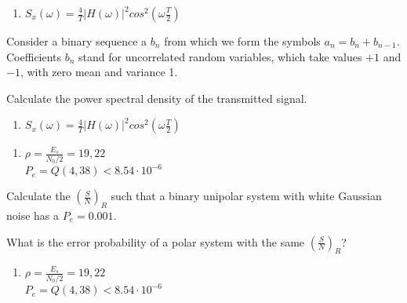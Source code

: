 \documentclass[en,boletin]{uah}
\begin{document}
{

\begin{enumerate}
	\item $S_x(\omega) = \frac{4}{T} |H(\omega)|^2 cos^2 \left ( \omega \frac{T}{2} \right ) $
\end{enumerate}
}
{

Consider a binary sequence a $b_n$ from which we form the symbols $a_n = b_n + b_{n-1}$. Coefficients $b_n$ stand for uncorrelated random variables, which take values $+1$ and $-1$, with zero mean and variance 1. 

Calculate the power spectral density of the transmitted signal.

}
{

\begin{enumerate}
	\item $S_x(\omega) = \frac{4}{T} |H(\omega)|^2 cos^2 \left ( \omega \frac{T}{2} \right ) $
\end{enumerate}
}




{
\begin{enumerate}
	\item $\rho = \frac{E_s}{N_0/2} = 19,22$ \\
		$P_e = Q(4,38) < 8.54 \cdot 10^{-6}$
\end{enumerate}
}
{

Calculate the $\left ( \frac{S}{N} \right )_R$ such that a binary unipolar system with white Gaussian noise has a $P_e= 0.001$. 

What is the error probability of a polar system with the same $\left ( \frac{S}{N} \right )_R$?

}
{
\begin{enumerate}
	\item $\rho = \frac{E_s}{N_0/2} = 19,22$ \\
		$P_e = Q(4,38) < 8.54 \cdot 10^{-6}$
\end{enumerate}
}
\end{document}
